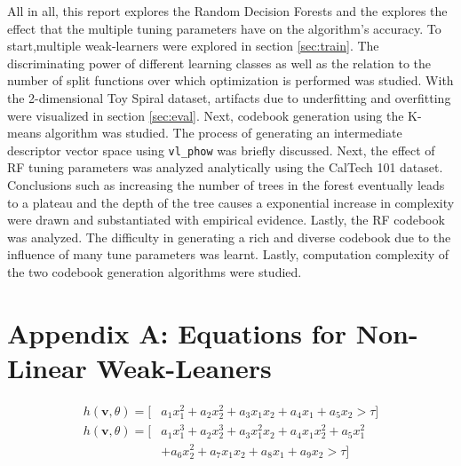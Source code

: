 \documentclass[a4paper,pra,twocolumn,10pt,aps,longbibliography,nobalancelastpage]{article}
\begin{document}
All in all, this report explores the Random Decision Forests and the explores the effect that the multiple tuning parameters have on the algorithm's accuracy. To start,multiple weak-learners were explored in section \ref{sec:train}. The discriminating power of different learning classes as well as the relation to the number of split functions over which optimization is performed was studied. With the 2-dimensional Toy Spiral dataset, artifacts due to underfitting and overfitting were visualized in section \ref{sec:eval}. Next, codebook generation using the K-means algorithm was studied. The process of generating an intermediate descriptor vector space using \texttt{vl\_phow} was briefly discussed. Next, the effect of RF tuning parameters was analyzed analytically using the CalTech 101 dataset. Conclusions such as increasing the number of trees in the forest eventually leads to a plateau and the depth of the tree causes a exponential increase in complexity were drawn and substantiated with empirical evidence. Lastly, the RF codebook was analyzed. The difficulty in generating a rich and diverse codebook due to the influence of many tune parameters was learnt. Lastly, computation complexity of the two codebook generation algorithms were studied. 

\newpage
\onecolumn


\newpage
\section*{Appendix A: Equations for Non-Linear Weak-Leaners}
\begin{align}
h(\textbf{v}, \theta) = [&a_1x_1^2+a_2x_2^2+a_3x_1x_2+a_4x_1+a_5x_2>\tau] \label{eq:quad_split} \\
h(\textbf{v}, \theta) = [&a_1x_1^3+a_2x_2^3+a_3x_1^2x_2+a_4x_1x_2^2+a_5x_1^2 \nonumber\\
&+a_6x_2^2+a_7x_1x_2+a_8x_1+a_9x_2>\tau] \label{eq:cubic_split}
\end{align}
\end{document}
